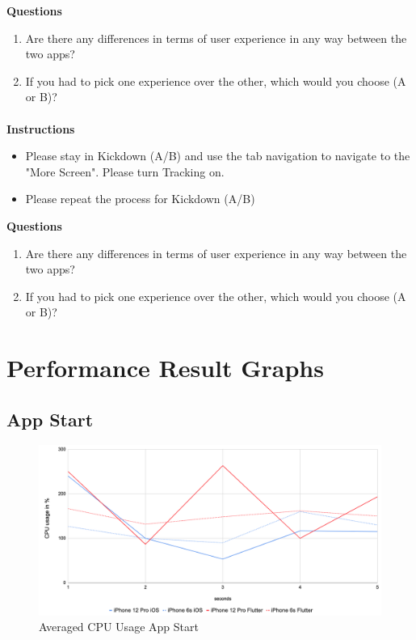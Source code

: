 \textbf{Questions}
\begin{enumerate}
    \item Are there any differences in terms of user experience in any way between the two apps?
    \item If you had to pick one experience over the other, which would you choose (A or B)?
\end{enumerate}

\paragraph*{    }\hfill \break
\textbf{Instructions}
\begin{itemize}
    \item Please stay in Kickdown (A/B) and use the tab navigation to navigate to the "More Screen". Please turn Tracking on.
    \item Please repeat the process for Kickdown (A/B)
\end{itemize}

\textbf{Questions}
\begin{enumerate}
    \item Are there any differences in terms of user experience in any way between the two apps?
    \item If you had to pick one experience over the other, which would you choose (A or B)?
\end{enumerate}


\section{Performance Result Graphs} \label{section::performance_tracing_results}

\subsection{App Start}

\begin{figure}[!h]
    \centering
    \includegraphics[width=\linewidth]{images/performance_results/app_start/avg_cpu_usage_app_start.png}
    \caption{Averaged CPU Usage App Start}
    \label{fig:avg_cpu_usage_app_start}
\end{figure}

